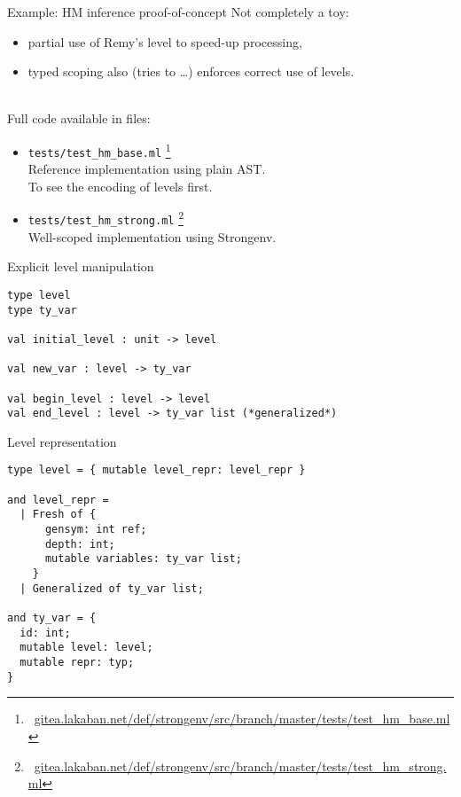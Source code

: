 \documentclass{beamer}          %
\begin{document}
\begin{frame}{Example: HM inference proof-of-concept}
  Not completely a toy:
  \begin{itemize}
    \item partial use of Remy's level to speed-up processing,
    \item typed scoping also (tries to \ldots) enforces correct use of levels.
  \end{itemize}

  ~\\

  \pause
  Full code available in files:
  \begin{itemize}
    \item {\tt tests/test\_hm\_base.ml}
          \footnote{~\href{https://gitea.lakaban.net/def/strongenv/src/branch/master/tests/test_hm_base.ml}{gitea.lakaban.net/def/strongenv/src/branch/master/tests/test\_hm\_base.ml}} \\
          Reference implementation using plain AST. \\
          To see the encoding of levels first.

     \pause
    \item {\tt tests/test\_hm\_strong.ml}
\footnote{~\href{https://gitea.lakaban.net/def/strongenv/src/branch/master/tests/test_hm_strong.ml}{gitea.lakaban.net/def/strongenv/src/branch/master/tests/test\_hm\_strong.ml}} \\
          Well-scoped implementation using Strongenv.
  \end{itemize}

\end{frame}

\begin{frame}[fragile]{Explicit level manipulation}

\begin{lstlisting}
type level
type ty_var

val initial_level : unit -> level

val new_var : level -> ty_var

val begin_level : level -> level
val end_level : level -> ty_var list (*generalized*)
\end{lstlisting}

\end{frame}

\begin{frame}[fragile]{Level representation}

\begin{lstlisting}
type level = { mutable level_repr: level_repr }

and level_repr =
  | Fresh of {
      gensym: int ref;
      depth: int;
      mutable variables: ty_var list;
    }
  | Generalized of ty_var list;

and ty_var = {
  id: int;
  mutable level: level;
  mutable repr: typ;
}
\end{lstlisting}

\end{frame}
\end{document}
